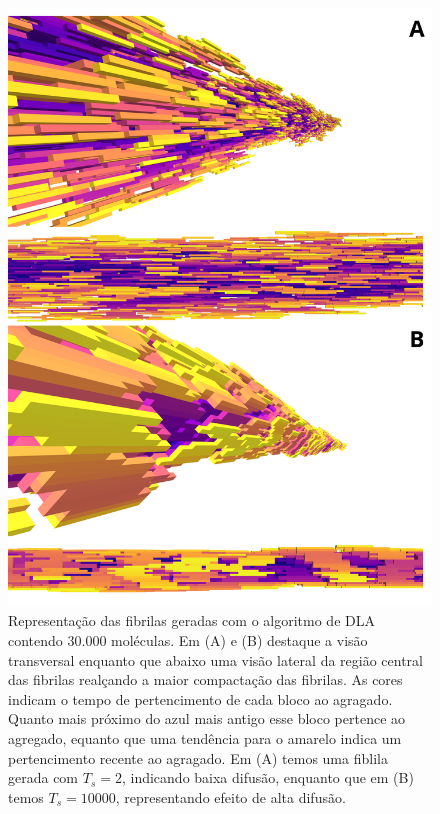 \documentclass{article}
\begin{document}
    \begin{figure}[H]
        \centering
        \includegraphics[width=\textwidth]{figures/fibrils.png}

        \caption{Representação das fibrilas geradas com o algoritmo de DLA contendo $30.000$ moléculas. 
        Em (A) e (B) destaque a visão transversal enquanto que abaixo uma visão lateral da região central
        das fibrilas realçando a maior compactação das fibrilas. As cores indicam 
        o tempo de pertencimento de cada bloco ao agragado. Quanto mais próximo do azul mais antigo esse 
        bloco pertence ao agregado, equanto que uma tendência para o amarelo indica um pertencimento recente 
        ao agragado. Em (A) temos uma fiblila gerada com \(T_{s} = 2\), indicando baixa difusão, enquanto que 
        em (B) temos \(T_{s} = 10000\), representando efeito de alta difusão.} 

        \label{R1}
    \end{figure}
\end{document}

